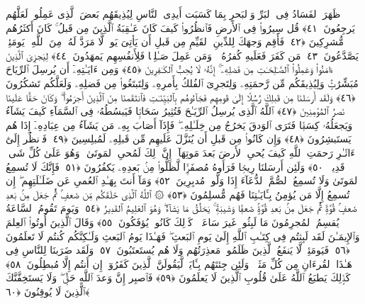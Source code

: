  ظَهَرَ ٱلفَسَادُ فِى ٱلبَرِّ وَٱلبَحرِ بِمَا كَسَبَت أَيدِى ٱلنَّاسِ لِيُذِيقَهُم بَعضَ ٱلَّذِى عَمِلُوا۟ لَعَلَّهُم يَرجِعُونَ ﴿٤١﴾
 قُل سِيرُوا۟ فِى ٱلأَرضِ فَٱنظُرُوا۟ كَيفَ كَانَ عَـٰقِبَةُ ٱلَّذِينَ مِن قَبلُ ۚ كَانَ أَكثَرُهُم مُّشرِكِينَ ﴿٤٢﴾
 فَأَقِم وَجهَكَ لِلدِّينِ ٱلقَيِّمِ مِن قَبلِ أَن يَأتِىَ يَومٌۭ لَّا مَرَدَّ لَهُۥ مِنَ ٱللَّهِ ۖ يَومَئِذٍۢ يَصَّدَّعُونَ ﴿٤٣﴾
 مَن كَفَرَ فَعَلَيهِ كُفرُهُۥ ۖ وَمَن عَمِلَ صَـٰلِحًۭا فَلِأَنفُسِهِم يَمهَدُونَ ﴿٤٤﴾
 لِيَجزِىَ ٱلَّذِينَ ءَامَنُوا۟ وَعَمِلُوا۟ ٱلصَّـٰلِحَـٰتِ مِن فَضلِهِۦٓ ۚ إِنَّهُۥ لَا يُحِبُّ ٱلكَـٰفِرِينَ ﴿٤٥﴾
 وَمِن ءَايَـٰتِهِۦٓ أَن يُرسِلَ ٱلرِّيَاحَ مُبَشِّرَٰتٍۢ وَلِيُذِيقَكُم مِّن رَّحمَتِهِۦ وَلِتَجرِىَ ٱلفُلكُ بِأَمرِهِۦ وَلِتَبتَغُوا۟ مِن فَضلِهِۦ وَلَعَلَّكُم تَشكُرُونَ ﴿٤٦﴾
 وَلَقَد أَرسَلنَا مِن قَبلِكَ رُسُلًا إِلَىٰ قَومِهِم فَجَآءُوهُم بِٱلبَيِّنَـٰتِ فَٱنتَقَمنَا مِنَ ٱلَّذِينَ أَجرَمُوا۟ ۖ وَكَانَ حَقًّا عَلَينَا نَصرُ ٱلمُؤمِنِينَ ﴿٤٧﴾
 ٱللَّهُ ٱلَّذِى يُرسِلُ ٱلرِّيَـٰحَ فَتُثِيرُ سَحَابًۭا فَيَبسُطُهُۥ فِى ٱلسَّمَآءِ كَيفَ يَشَآءُ وَيَجعَلُهُۥ كِسَفًۭا فَتَرَى ٱلوَدقَ يَخرُجُ مِن خِلَـٰلِهِۦ ۖ فَإِذَآ أَصَابَ بِهِۦ مَن يَشَآءُ مِن عِبَادِهِۦٓ إِذَا هُم يَستَبشِرُونَ ﴿٤٨﴾
 وَإِن كَانُوا۟ مِن قَبلِ أَن يُنَزَّلَ عَلَيهِم مِّن قَبلِهِۦ لَمُبلِسِينَ ﴿٤٩﴾
 فَٱنظُر إِلَىٰٓ ءَاثَـٰرِ رَحمَتِ ٱللَّهِ كَيفَ يُحىِ ٱلأَرضَ بَعدَ مَوتِهَآ ۚ إِنَّ ذَٟلِكَ لَمُحىِ ٱلمَوتَىٰ ۖ وَهُوَ عَلَىٰ كُلِّ شَىءٍۢ قَدِيرٌۭ ﴿٥٠﴾
 وَلَئِن أَرسَلنَا رِيحًۭا فَرَأَوهُ مُصفَرًّۭا لَّظَلُّوا۟ مِنۢ بَعدِهِۦ يَكفُرُونَ ﴿٥١﴾
 فَإِنَّكَ لَا تُسمِعُ ٱلمَوتَىٰ وَلَا تُسمِعُ ٱلصُّمَّ ٱلدُّعَآءَ إِذَا وَلَّوا۟ مُدبِرِينَ ﴿٥٢﴾
 وَمَآ أَنتَ بِهَـٰدِ ٱلعُمىِ عَن ضَلَـٰلَتِهِم ۖ إِن تُسمِعُ إِلَّا مَن يُؤمِنُ بِـَٔايَـٰتِنَا فَهُم مُّسلِمُونَ ﴿٥٣﴾
 ۞ ٱللَّهُ ٱلَّذِى خَلَقَكُم مِّن ضَعفٍۢ ثُمَّ جَعَلَ مِنۢ بَعدِ ضَعفٍۢ قُوَّةًۭ ثُمَّ جَعَلَ مِنۢ بَعدِ قُوَّةٍۢ ضَعفًۭا وَشَيبَةًۭ ۚ يَخلُقُ مَا يَشَآءُ ۖ وَهُوَ ٱلعَلِيمُ ٱلقَدِيرُ ﴿٥٤﴾
 وَيَومَ تَقُومُ ٱلسَّاعَةُ يُقسِمُ ٱلمُجرِمُونَ مَا لَبِثُوا۟ غَيرَ سَاعَةٍۢ ۚ كَذَٟلِكَ كَانُوا۟ يُؤفَكُونَ ﴿٥٥﴾
 وَقَالَ ٱلَّذِينَ أُوتُوا۟ ٱلعِلمَ وَٱلإِيمَـٰنَ لَقَد لَبِثتُم فِى كِتَـٰبِ ٱللَّهِ إِلَىٰ يَومِ ٱلبَعثِ ۖ فَهَـٰذَا يَومُ ٱلبَعثِ وَلَـٰكِنَّكُم كُنتُم لَا تَعلَمُونَ ﴿٥٦﴾
 فَيَومَئِذٍۢ لَّا يَنفَعُ ٱلَّذِينَ ظَلَمُوا۟ مَعذِرَتُهُم وَلَا هُم يُستَعتَبُونَ ﴿٥٧﴾
 وَلَقَد ضَرَبنَا لِلنَّاسِ فِى هَـٰذَا ٱلقُرءَانِ مِن كُلِّ مَثَلٍۢ ۚ وَلَئِن جِئتَهُم بِـَٔايَةٍۢ لَّيَقُولَنَّ ٱلَّذِينَ كَفَرُوٓا۟ إِن أَنتُم إِلَّا مُبطِلُونَ ﴿٥٨﴾
 كَذَٟلِكَ يَطبَعُ ٱللَّهُ عَلَىٰ قُلُوبِ ٱلَّذِينَ لَا يَعلَمُونَ ﴿٥٩﴾
 فَٱصبِر إِنَّ وَعدَ ٱللَّهِ حَقٌّۭ ۖ وَلَا يَستَخِفَّنَّكَ ٱلَّذِينَ لَا يُوقِنُونَ ﴿٦٠﴾
 
